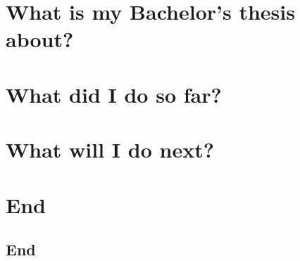 \documentclass[hyperref={pdfpagelabels=false},usepdftitle=false]{beamer}
\begin{document}

\title{\titleText}
\subtitle{Bachelor's thesis of Martin Thoma}
\author{\tutor}
\date{5th of June, 2014}

\frame{\titlepage}



\section{What is my Bachelor's thesis about?}


\section{What did I do so far?}


\section{What will I do next?}


\section{End}
\subsection{End}

\end{document}
